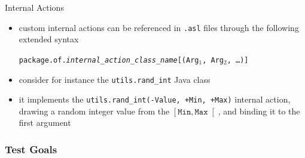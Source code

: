 \documentclass[presentation]{beamer}\mode<presentation>{\usetheme{AMSBolognaFC}}
\begin{document}
\begin{frame}[c, allowframebreaks]{\jason{} Internal Actions}
\begin{itemize}
        \vspace{.3cm}
        
        \item custom internal actions can be referenced in \texttt{.asl} files through the following extended syntax
        \begin{center}
            \texttt{\alert{package.of.}\textit{internal\_action\_class\_name}\alert{[}(Arg$_1$, Arg$_2$, \ldots)\alert{]}}
        \end{center}
    
        \vspace{.3cm}
        
        \item consider for instance the \texttt{utils.rand\_int} Java class
        
        
        \vspace{.3cm}
        
        \item it implements the \texttt{utils.rand\_int(-Value, +Min, +Max)} internal action, drawing a random integer value from the $\left[\mathtt{Min}, \mathtt{Max}\right[$, and binding it to the first argument	
        
    \end{itemize}
\end{frame}

\subsubsection{Test Goals}
\end{document}
